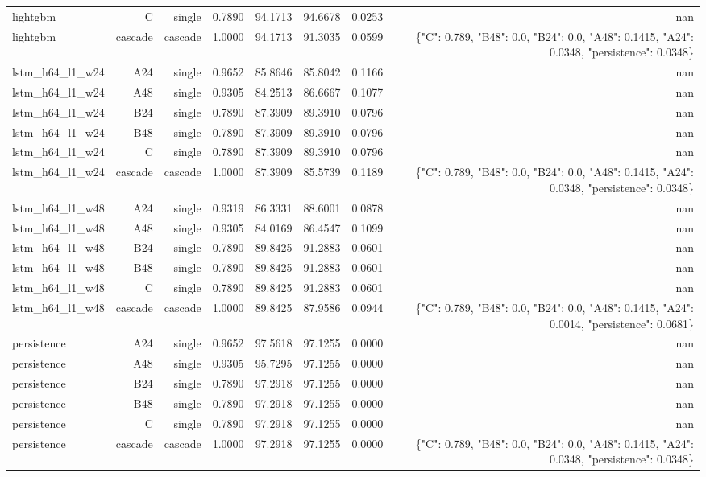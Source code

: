 \begin{table}[htbp]
\begin{tabular}{lrrrrrrr}
lightgbm & C & single & 0.7890 & 94.1713 & 94.6678 & 0.0253 & nan \\
lightgbm & cascade & cascade & 1.0000 & 94.1713 & 91.3035 & 0.0599 & \{"C": 0.789, "B48": 0.0, "B24": 0.0, "A48": 0.1415, "A24": 0.0348, "persistence": 0.0348\} \\
lstm\_h64\_l1\_w24 & A24 & single & 0.9652 & 85.8646 & 85.8042 & 0.1166 & nan \\
lstm\_h64\_l1\_w24 & A48 & single & 0.9305 & 84.2513 & 86.6667 & 0.1077 & nan \\
lstm\_h64\_l1\_w24 & B24 & single & 0.7890 & 87.3909 & 89.3910 & 0.0796 & nan \\
lstm\_h64\_l1\_w24 & B48 & single & 0.7890 & 87.3909 & 89.3910 & 0.0796 & nan \\
lstm\_h64\_l1\_w24 & C & single & 0.7890 & 87.3909 & 89.3910 & 0.0796 & nan \\
lstm\_h64\_l1\_w24 & cascade & cascade & 1.0000 & 87.3909 & 85.5739 & 0.1189 & \{"C": 0.789, "B48": 0.0, "B24": 0.0, "A48": 0.1415, "A24": 0.0348, "persistence": 0.0348\} \\
lstm\_h64\_l1\_w48 & A24 & single & 0.9319 & 86.3331 & 88.6001 & 0.0878 & nan \\
lstm\_h64\_l1\_w48 & A48 & single & 0.9305 & 84.0169 & 86.4547 & 0.1099 & nan \\
lstm\_h64\_l1\_w48 & B24 & single & 0.7890 & 89.8425 & 91.2883 & 0.0601 & nan \\
lstm\_h64\_l1\_w48 & B48 & single & 0.7890 & 89.8425 & 91.2883 & 0.0601 & nan \\
lstm\_h64\_l1\_w48 & C & single & 0.7890 & 89.8425 & 91.2883 & 0.0601 & nan \\
lstm\_h64\_l1\_w48 & cascade & cascade & 1.0000 & 89.8425 & 87.9586 & 0.0944 & \{"C": 0.789, "B48": 0.0, "B24": 0.0, "A48": 0.1415, "A24": 0.0014, "persistence": 0.0681\} \\
persistence & A24 & single & 0.9652 & 97.5618 & 97.1255 & 0.0000 & nan \\
persistence & A48 & single & 0.9305 & 95.7295 & 97.1255 & 0.0000 & nan \\
persistence & B24 & single & 0.7890 & 97.2918 & 97.1255 & 0.0000 & nan \\
persistence & B48 & single & 0.7890 & 97.2918 & 97.1255 & 0.0000 & nan \\
persistence & C & single & 0.7890 & 97.2918 & 97.1255 & 0.0000 & nan \\
persistence & cascade & cascade & 1.0000 & 97.2918 & 97.1255 & 0.0000 & \{"C": 0.789, "B48": 0.0, "B24": 0.0, "A48": 0.1415, "A24": 0.0348, "persistence": 0.0348\} \\

\end{tabular}
\end{table}
